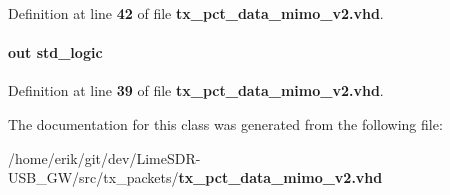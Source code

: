 Definition at line {\bf 42} of file {\bf tx\+\_\+pct\+\_\+data\+\_\+mimo\+\_\+v2.\+vhd}.

\paragraph[{tx\+\_\+outfifo\+\_\+rdy}]{ {\bfseries \textcolor{keywordflow}{out}\textcolor{vhdlchar}{ }} {\bfseries \textcolor{comment}{std\+\_\+logic}\textcolor{vhdlchar}{ }} \hspace{0.3cm}{\ttfamily [Port]}}\label{classtx__pct__data__mimo__v2_a97619b0e6bd83cf1b714dfc609a56a82}


Definition at line {\bf 39} of file {\bf tx\+\_\+pct\+\_\+data\+\_\+mimo\+\_\+v2.\+vhd}.



The documentation for this class was generated from the following file\+:\begin{DoxyCompactItemize}
\item 
/home/erik/git/dev/\+Lime\+S\+D\+R-\/\+U\+S\+B\+\_\+\+G\+W/src/tx\+\_\+packets/{\bf tx\+\_\+pct\+\_\+data\+\_\+mimo\+\_\+v2.\+vhd}\end{DoxyCompactItemize}

